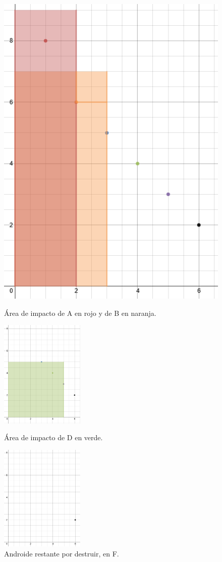 \documentclass[10pt,a4paper]{article}
\begin{document}
\begin{figure}
\centering
\begin{minipage}{.5\textwidth}
  \centering
  \includegraphics[width=.4\linewidth]{EjemploArea1}
  \caption{Área de impacto de A en rojo y de B en naranja.}
  \label{fig:test1}
\end{minipage}%
\begin{minipage}{.5\textwidth}
  \centering
  \includegraphics[width=4cm]{EjemploArea2}
  \caption{Área de impacto de D en verde.}
  \label{fig:test2}
\end{minipage}

\begin{minipage}{.5\textwidth}
  \centering
  \includegraphics[width=4cm]{EjemploArea3}
  \caption{Androide restante por destruir, en F.}
  \label{fig:test2}
\end{minipage}

\end{figure}
\end{document}
